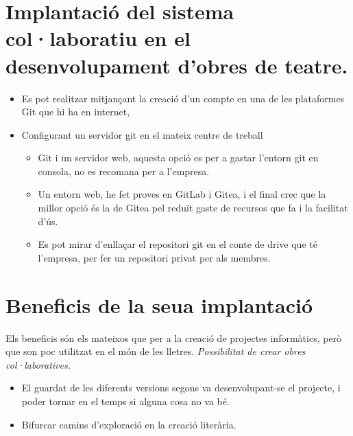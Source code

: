 \documentclass[
  10pt,
]{krantz}
\providecommand{\tightlist}{%
  \setlength{\itemsep}{0pt}\setlength{\parskip}{0pt}}
\begin{document}
\hypertarget{implantaciuxf3-del-sistema-collaboratiu-en-el-desenvolupament-dobres-de-teatre.}{%
\section{Implantació del sistema col·laboratiu en el desenvolupament d'obres de teatre.}\label{implantaciuxf3-del-sistema-collaboratiu-en-el-desenvolupament-dobres-de-teatre.}}

\begin{itemize}
\tightlist
\item
  Es pot realitzar mitjançant la creació d'un compte en una de les plataformes Git que hi ha en internet,
\item
  Configurant un servidor git en el mateix centre de treball

  \begin{itemize}
  \tightlist
  \item
    Git i un servidor web, aquesta opció es per a gastar l'entorn git en consola, no es recomana per a l'empresa.
  \item
    Un entorn web, he fet proves en GitLab i Gitea, i el final crec que la millor opció és la de Gitea pel reduït gaste de recursos que fa i la facilitat d'ús.
  \item
    Es pot mirar d'enllaçar el repositori git en el conte de drive que té l'empresa, per fer un repositori privat per als membres.
  \end{itemize}
\end{itemize}

\hypertarget{beneficis-de-la-seua-implantaciuxf3}{%
\section{Beneficis de la seua implantació}\label{beneficis-de-la-seua-implantaciuxf3}}

Els beneficis són els mateixos que per a la creació de projectes informàtics, però que son poc utilitzat en el món de les lletres. \emph{Possibilitat de crear obres col·laboratives.}

\begin{itemize}
\tightlist
\item
  El guardat de les diferents versions segons va desenvolupant-se el projecte, i poder tornar en el temps si alguna cosa no va bé.
\item
  Bifurcar camins d'exploració en la creació literària.
\end{itemize}
\end{document}
